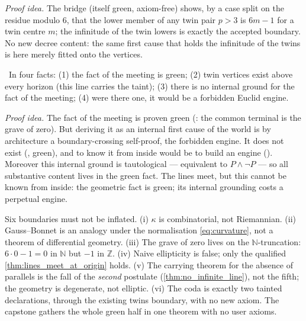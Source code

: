 \emph{Proof idea.} The bridge  (itself green, axiom-free) shows, by a
case split on the residue modulo $6$, that the lower member of any twin pair $p > 3$ is $6m - 1$ for a
twin centre $m$; the infinitude of the twin lowers is exactly the accepted boundary. No new decree
content: the same first cause that holds the infinitude of the twins is here merely fitted onto the
vertices.

\begin{theorem}\label{thm:lines_meet_but_unknowable_from_inside}
\yellow{}\ In four facts: (1) the fact of the meeting is green; (2) twin vertices exist above every
horizon (this line carries the taint); (3) there is no internal ground for the fact of the meeting;
(4) were there one, it would be a forbidden Euclid engine.
\end{theorem}

\emph{Proof idea.} The fact of the meeting is proven green
(: the common terminal is the grave of zero). But deriving it as an
internal first cause of the  world is by
architecture a boundary-crossing self-proof, the forbidden engine. It does not exist
(, green), and to know it from inside would be to build an
engine (). Moreover this internal ground is tautological ---
equivalent to $P \wedge \neg P$ --- so all substantive
content lives in the green fact. The lines meet, but this cannot be known from inside: the geometric
fact is green; its internal grounding costs a perpetual engine.

\begin{remark}
Six boundaries must not be inflated. (i) $\kappa$ is combinatorial, not Riemannian. (ii) Gauss--Bonnet
is an analogy under the normalisation \cref{eq:curvature}, not a theorem of differential geometry.
(iii) The grave of zero lives on the $\mathbb{N}$-truncation: $6\cdot 0 - 1 = 0$ in $\mathbb{N}$ but
$-1$ in $\mathbb{Z}$. (iv) Naive ellipticity is false; only the qualified \cref{thm:lines_meet_at_origin}
holds. (v) The carrying theorem for the absence of parallels is the fall of the \emph{second}
postulate (\cref{thm:no_infinite_line}), not the fifth; the geometry is degenerate, not elliptic.
(vi) The coda is exactly two tainted declarations, through the existing twins boundary, with no new
axiom. The capstone  gathers the whole green half in one theorem
with no user axioms.
\end{remark}


